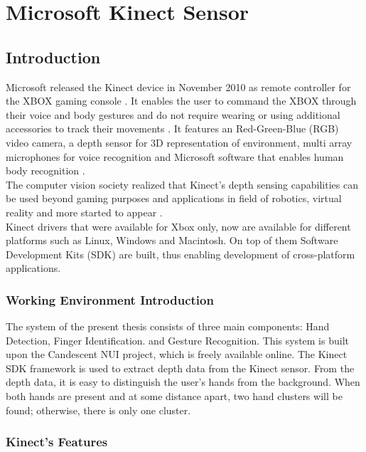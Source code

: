 

\chapter{Microsoft  Kinect Sensor}

\section{Introduction}

Microsoft released the Kinect device in November 2010 as remote controller for the XBOX gaming console \cite{kinect1}. 
It enables the user to command the XBOX through their voice and body gestures and do not require wearing or using additional accessories to track their movements \cite{kinect1}.
 It features an Red-Green-Blue (RGB) video camera, a depth sensor for 3D representation of environment, multi array microphones for voice recognition and Microsoft software that enables human body recognition \cite{kinect1}. \\
The computer vision society realized that Kinect’s depth sensing capabilities can be used beyond gaming purposes and applications in field of robotics, virtual reality and more started to appear \cite{kinect15}. \\
Kinect drivers that were available for Xbox only, now are available for different platforms such as Linux, Windows and Macintosh. 
On top of them Software Development Kits (SDK) are built, thus enabling development of cross-platform applications.

\subsection{Working  Environment  Introduction }
The system of the present thesis consists of three main components:  Hand Detection,  Finger Identification. and Gesture Recognition.  This system is built upon the Candescent  NUI \cite{d} project,  which is freely available online. The Kinect SDK  framework is used to extract  depth data  from the Kinect sensor. From the depth data,  it is easy to distinguish  the user's hands from the background.  When both  hands are present and at some distance apart,  two hand clusters will be found; otherwise, there is only one cluster. 

\subsection{Kinect's Features }

